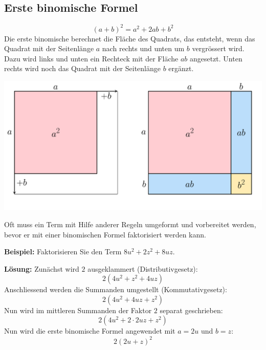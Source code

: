 \subsection{Erste binomische Formel}
\[
  (a+b)^{2} = a^{2} + 2ab + b^{2}
\]
Die erste binomische berechnet die Fläche des Quadrats, das entsteht, wenn das Quadrat mit der Seitenlänge $a$ nach rechts und unten um $b$ vergrössert wird. Dazu wird links und unten ein Rechteck mit der Fläche $ab$ angesetzt. Unten rechts wird noch das Quadrat mit der Seitenlänge $b$ ergänzt.
\begin{center}
  \includegraphics[width=.8\textwidth]{Binomische Formel 1.pdf}
\end{center}
Oft muss ein Term mit Hilfe anderer Regeln umgeformt und vorbereitet werden, bevor er mit einer binomischen Formel faktorisiert werden kann.
\begin{example}
  \textbf{Beispiel:} Faktorisieren Sie den Term $8u^{2}+2z^{2}+8uz$.

  \textbf{Lösung:} Zunächst wird $2$ ausgeklammert (Distributivgesetz):
  \[
    2\left(4u^{2}+z^{2}+4uz\right)
  \]
  Anschliessend werden die Summanden umgestellt (Kommutativgesetz):
  \[
    2\left(4u^{2}+4uz+z^{2}\right)
  \]
  Nun wird im mittleren Summanden der Faktor $2$ separat geschrieben:
  \[
    2\left(4u^{2}+2\cdot 2uz+z^{2}\right)
  \]
  Nun wird die erste binomische Formel angewendet mit $a=2u$ und $b=z$:
  \[
    2(2u+z)^{2}
  \]
\end{example}

\newpage

